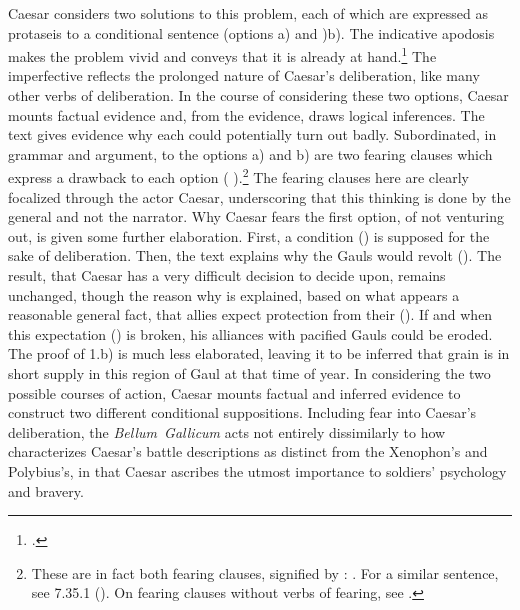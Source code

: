 \documentclass[12pt,letterpaper,oneside,final]{memoir}
\begin{document}
\begin{latin}
\begin{enumerate}
\end{enumerate} \DoubleSpacing \end{latin} Caesar considers two solutions to this problem, each of which are expressed as protaseis to a conditional sentence (options a) and )b). The indicative apodosis makes the problem vivid and conveys that it is already at hand.\footnote{ \textcite[§517.b., p.~329]{greenough1903}.} The imperfective  reflects the prolonged nature of Caesar's deliberation, like many other verbs of deliberation. In the course of considering these two options, Caesar mounts factual evidence and, from the evidence, draws logical inferences. The text gives evidence why each could potentially turn out badly. Subordinated, in grammar and argument, to the options a) and b) are two fearing clauses which express a drawback to each option ( ).\footnote{These are in fact both fearing clauses, signified by : . For a similar sentence, see 7.35.1 (). On fearing clauses without verbs of fearing, see \textcite[146]{woodcock1959}.} The fearing clauses here are clearly focalized through the actor Caesar, underscoring that this thinking is done by the general and not the narrator. Why Caesar fears the first option, of not venturing out, is given some further elaboration. First, a condition () is supposed for the sake of deliberation. Then, the text explains why the Gauls would revolt (). The result, that Caesar has a very difficult decision to decide upon, remains unchanged, though the reason why is explained, based on what appears a reasonable general fact, that allies expect protection from their  (). If and when this expectation () is broken, his alliances with pacified Gauls could be eroded. The proof of 1.b) is much less elaborated, leaving it to be inferred that grain is in short supply in this region of Gaul at that time of year. In considering the two possible courses of action, Caesar mounts factual and inferred evidence to construct two different conditional suppositions. Including fear into Caesar's deliberation, the \emph{Bellum~Gallicum} acts not entirely dissimilarly to how \textcite{lendon1999} characterizes Caesar's battle descriptions as distinct from the Xenophon's and Polybius's, in that Caesar ascribes the utmost importance to soldiers' psychology and bravery. %
\end{document}
